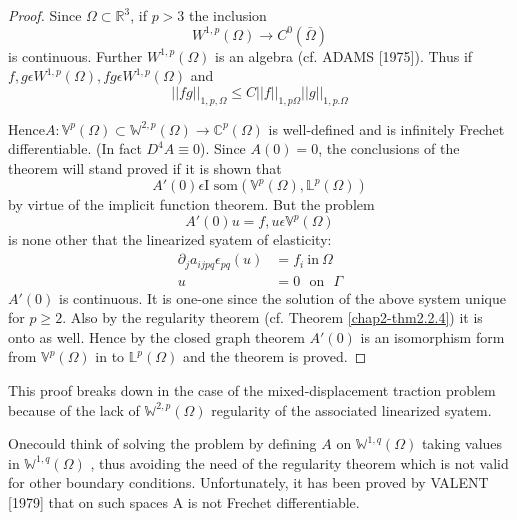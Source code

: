 \begin{proof}
   Since $\Omega \subset \mathbb{R}^3$, if $p > 3$ the inclusion 
   $$
   W^{1,p} (\Omega) \to C^0 (\bar{\Omega})
   $$
   is continuous. Further $W^{1,p}(\Omega)$ is an algebra (cf. ADAMS
   [1975]). Thus if $f,g \epsilon W^{1,p}(\Omega), fg \epsilon
   W^{1,p}(\Omega)$ and 
   \begin{equation*}
     || fg || _{1,p,\Omega} \le C || f || _{1,p\Omega} || g
     ||_{1,p.\Omega}\tag{2.3-9} \label{eq2.3-9}
   \end{equation*}

   Hence\pageoriginale $A: \mathbb{V}^p(\Omega) \subset
   \mathbb{W}^{2,p} (\Omega) 
   \to \mathbb{C}^p (\Omega)$ is well-defined and is infinitely
   Frechet differentiable. (In fact $D^4 A\equiv 0$). Since $A(0)=0$,
   the conclusions of the theorem will stand proved if it is shown that  
   $$
   A'(0) \epsilon \text{I som} (\mathbb{V} ^p (\Omega), \mathbb{L}^p(\Omega))
   $$
   by virtue of the implicit function theorem. But the problem
   \begin{equation*}
     A'(0)u = f, u \epsilon \mathbb{V}^p (\Omega)\tag{2.3-10}\label{eq2.3-10}
   \end{equation*}
   is none other that the linearized syatem of elasticity:
   \begin{align*}
     \partial_ j a_{ijpq} \epsilon_{pq} (u) &= f_i
     ~\text{in}~\Omega\tag{2.3-11}\label{eq2.3-11}\\ 
     u &=0 \text{~ on ~} \Gamma\tag{2.3-12}\label{eq2.3-12} 
   \end{align*}
   $A'(0)$ is continuous. It is one-one since the solution of the above
   system unique for $p\ge 2$. Also by the regularity theorem (cf. Theorem
   \ref{chap2-thm2.2.4}) it is onto as well. Hence by the closed graph
   theorem $A'(0)$ 
   is an isomorphism form from $\mathbb{V}^p(\Omega)$ in to
   $\mathbb{L}^p(\Omega)$ and the theorem is proved. 
\end{proof}

\begin{remark}\label{chap2-rem2.3.1}%
   This proof breaks down in the case of the mixed-dis\-placement traction
   problem because of the lack of $\mathbb{W}^{2,p}(\Omega)$
   regularity of the associated linearized syatem. 
\end{remark} 

\begin{remark}\label{chap2-rem2.3.2}%
  One\pageoriginale could think of solving the problem by defining $A$
  on $\mathbb{W}^{1,q}(\Omega )$ taking values in $\mathbb {W}^{1,q}(\Omega )$ ,
  thus avoiding the need of the regularity theorem which is not valid
  for other 	boundary conditions. Unfortunately, it has been proved
  by VALENT [1979] that on such spaces A is not Frechet
  differentiable. 
\end{remark}

